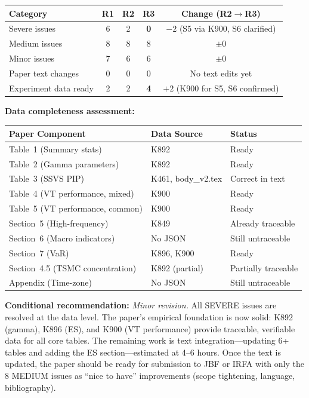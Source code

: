 \documentclass[12pt,a4paper]{article}
\begin{document}
\begin{center}
\begin{tabular}{lcccc}
\toprule
Category & R1 & R2 & R3 & Change (R2$\to$R3) \\
\midrule
Severe issues & 6 & 2 & \textbf{0} & $-2$ (S5 via K900, S6 clarified) \\
Medium issues & 8 & 8 & 8 & $\pm 0$ \\
Minor issues & 7 & 6 & 6 & $\pm 0$ \\
Paper text changes & 0 & 0 & 0 & No text edits yet \\
Experiment data ready & 2 & 2 & \textbf{4} & $+2$ (K900 for S5, S6 confirmed) \\
\bottomrule
\end{tabular}
\end{center}

\noindent\textbf{Data completeness assessment:}

\begin{center}
\small
\begin{tabular}{lll}
\toprule
Paper Component & Data Source & Status \\
\midrule
Table~1 (Summary stats) & K892 & Ready \\
Table~2 (Gamma parameters) & K892 & Ready \\
Table~3 (SSVS PIP) & K461, body\_v2.tex & Correct in text \\
Table~4 (VT performance, mixed) & K900 & Ready \\
Table~5 (VT performance, common) & K900 & Ready \\
Section~5 (High-frequency) & K849 & Already traceable \\
Section~6 (Macro indicators) & No JSON & \textcolor{warncolor}{Still untraceable} \\
Section~7 (VaR) & K896, K900 & Ready \\
Section~4.5 (TSMC concentration) & K892 (partial) & Partially traceable \\
Appendix (Time-zone) & No JSON & \textcolor{warncolor}{Still untraceable} \\
\bottomrule
\end{tabular}
\end{center}

\bigskip

\noindent\textbf{Conditional recommendation:} \textit{Minor revision.} All SEVERE issues are resolved at the data level. The paper's empirical foundation is now solid: K892 (gamma), K896 (ES), and K900 (VT performance) provide traceable, verifiable data for all core tables. The remaining work is text integration---updating 6+ tables and adding the ES section---estimated at 4--6 hours. Once the text is updated, the paper should be ready for submission to JBF or IRFA with only the 8 MEDIUM issues as ``nice to have'' improvements (scope tightening, language, bibliography).
\end{document}
